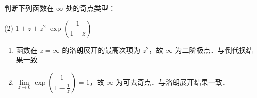 \documentclass[12pt, a4paper, oneside, UTF8]{ctexbook}
\begin{document}
\begin{example}
    判断下列函数在 $\infty$ 处的奇点类型：
    \begin{tasks}[label=(\arabic*)](2)
        \task $1+z+z^2$
        \task $\exp\left(\dfrac{1}{1-z}\right)$
    \end{tasks}
\end{example}
\begin{solution}
    \begin{enumerate}[label=(\arabic*)]
        \item 函数在 $z=\infty$ 的洛朗展开的最高次项为 $z^2$，故 $\infty$ 为二阶极点．与倒代换结果一致
        
        \item $\lim\limits_{z\to 0} \exp\left(\dfrac{1}{1-\frac{1}{z}}\right) = 1$，故 $\infty$ 为可去奇点．与洛朗展开结果一致．
    \end{enumerate}
\end{solution}
\ifx\allfiles\undefined
\end{document}
